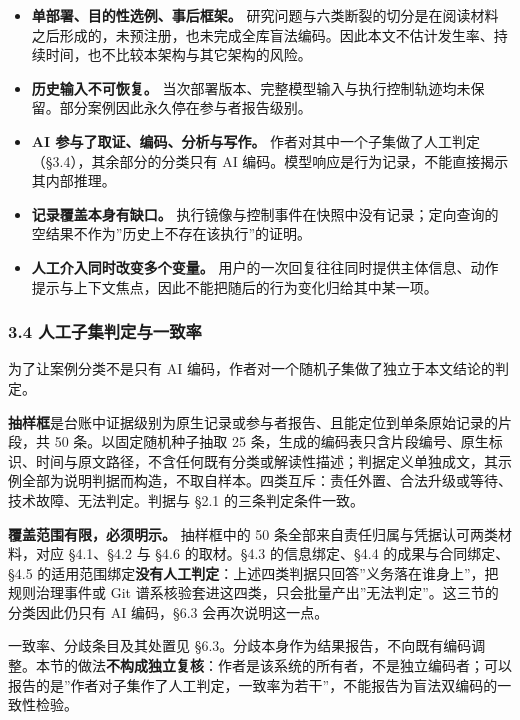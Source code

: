 \documentclass[
]{article}
\providecommand{\tightlist}{%
  \setlength{\itemsep}{0pt}\setlength{\parskip}{0pt}}
\begin{document}
\begin{itemize}
\tightlist
\item
  \textbf{单部署、目的性选例、事后框架。}
  研究问题与六类断裂的切分是在阅读材料之后形成的，未预注册，也未完成全库盲法编码。因此本文不估计发生率、持续时间，也不比较本架构与其它架构的风险。
\item
  \textbf{历史输入不可恢复。}
  当次部署版本、完整模型输入与执行控制轨迹均未保留。部分案例因此永久停在参与者报告级别。
\item
  \textbf{AI 参与了取证、编码、分析与写作。}
  作者对其中一个子集做了人工判定（§3.4），其余部分的分类只有 AI
  编码。模型响应是行为记录，不能直接揭示其内部推理。
\item
  \textbf{记录覆盖本身有缺口。}
  执行镜像与控制事件在快照中没有记录；定向查询的空结果不作为''历史上不存在该执行''的证明。
\item
  \textbf{人工介入同时改变多个变量。}
  用户的一次回复往往同时提供主体信息、动作提示与上下文焦点，因此不能把随后的行为变化归给其中某一项。
\end{itemize}

\subsubsection{3.4
人工子集判定与一致率}\label{ux4ebaux5de5ux5b50ux96c6ux5224ux5b9aux4e0eux4e00ux81f4ux7387}

为了让案例分类不是只有 AI
编码，作者对一个随机子集做了独立于本文结论的判定。

\textbf{抽样框}是台账中证据级别为原生记录或参与者报告、且能定位到单条原始记录的片段，共
50 条。以固定随机种子抽取 25
条，生成的编码表只含片段编号、原生标识、时间与原文路径，不含任何既有分类或解读性描述；判据定义单独成文，其示例全部为说明判据而构造，不取自样本。四类互斥：责任外置、合法升级或等待、技术故障、无法判定。判据与
§2.1 的三条判定条件一致。

\textbf{覆盖范围有限，必须明示。} 抽样框中的 50
条全部来自责任归属与凭据认可两类材料，对应 §4.1、§4.2 与 §4.6
的取材。§4.3 的信息绑定、§4.4 的成果与合同绑定、§4.5
的适用范围绑定\textbf{没有人工判定}：上述四类判据只回答''义务落在谁身上''，把规则治理事件或
Git 谱系核验套进这四类，只会批量产出''无法判定''。这三节的分类因此仍只有
AI 编码，§6.3 会再次说明这一点。

一致率、分歧条目及其处置见
§6.3。分歧本身作为结果报告，不向既有编码调整。本节的做法\textbf{不构成独立复核}：作者是该系统的所有者，不是独立编码者；可以报告的是''作者对子集作了人工判定，一致率为若干''，不能报告为盲法双编码的一致性检验。
\end{document}

